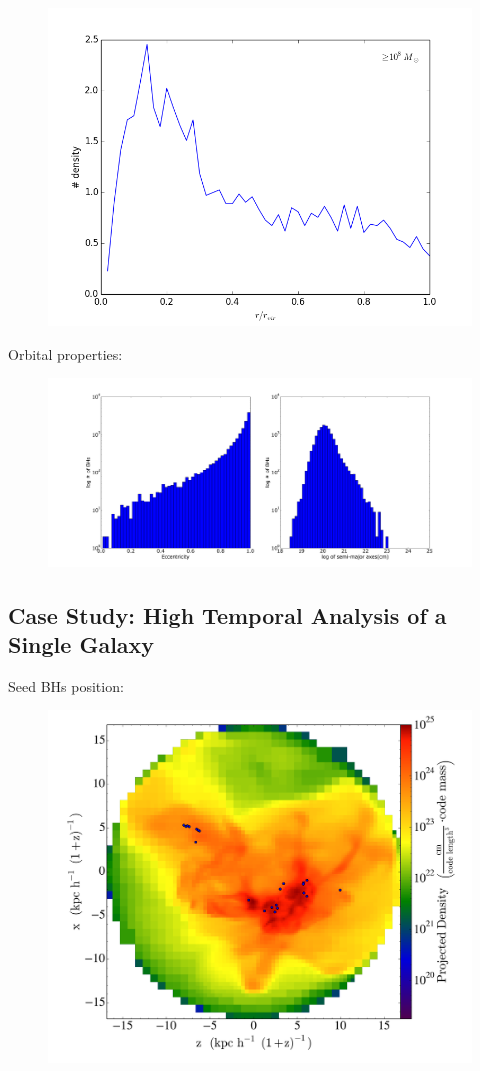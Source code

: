 \documentclass[useAMS,usenatbib]{mn2e}
\begin{document}
\begin{figure}
  \centering
  \includegraphics[width=0.8\columnwidth]{radist_mass9.png}
\end{figure}

Orbital properties:
\begin{figure}
  \centering
  \includegraphics[width=0.8\columnwidth]{bhsorb_new.png}
\end{figure}



\subsection{Case Study: High Temporal Analysis of a Single Galaxy}

Seed BHs position:
\begin{figure}
  \centering
  \includegraphics[width=0.8\columnwidth]{P0173_y_D.png}
\end{figure}
\end{document}
